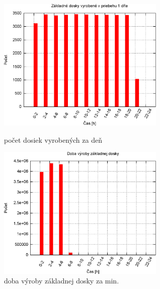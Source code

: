 \documentclass[12pt,a4paper,titlepage,final]{article}
\begin{document}
\begin{figure}[!h]
  \centering
  \begin{minipage}{0.45\linewidth}
  \centering
  \includegraphics[width=8cm]{doc/3_hist1.eps}
  \caption{počet dosiek vyrobených za deň}
  \end{minipage}
  \quad
  \begin{minipage}{0.45\linewidth}
    \centering
    \includegraphics[width=8cm]{doc/3_hist2.eps}
    \caption{doba výroby základnej dosky za min.}
  \end{minipage}
\end{figure}
\end{document}
